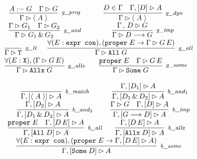 {
\renewcommand{\arraystretch}{3.25}
\newcommand{\GRrlsbc}{\inferH[\rlnmsbc{}]{\seqsl[\Gamma]{\atom{A}}}{\prog{A}{G} & \seqsl[\Gamma]{G}}}
\newcommand{\GRrlsinit}{\inferH[\rlnmsinit{}]{\seqsl[\Gamma]{\atom{A}}}{D \in \Gamma & \bchsl[\Gamma]{D}{A}}}
\newcommand{\GRrlst}{\inferH[\rlnmst{}]{\seqsl[\Gamma]{\sltm{T}}}{}}
\newcommand{\GRrlsand}{\inferH[\rlnmsand{}]{\seqsl[\Gamma]{G_1 \, \& \, G_2}}{\seqsl[\Gamma]{G_1} & \seqsl[\Gamma]{G_2}}}
\newcommand{\GRrlsimp}{\inferH[\rlnmsimp{}]{\seqsl[\Gamma]{D \longrightarrow G}}{\seqsl[\Gamma \, , \, D]{G}}}
\newcommand{\GRrlsall}{\inferH[\rlnmsall{}]{\seqsl[\Gamma]{\sltm{All} \; G}}{\forall (E : \hybridtm{expr con}), (\sltm{proper} \; E \rightarrow \seqsl[\Gamma]{G \, E})}}
\newcommand{\GRrlsalls}{\inferH[\rlnmsalls{}]{\seqsl[\Gamma]{\sltm{Allx} \; G}}{\forall (E : \sltm{X}), (\seqsl[\Gamma]{G \, E})}}
\newcommand{\GRrlssome}{\inferH[\rlnmssome{}]{\seqsl[\Gamma]{\sltm{Some} \; G}}{\sltm{proper} \; E & \seqsl[\Gamma]{G \, E}}}

\begin{figure}%
$$
\begin{tabular}{c c}
\GRrlsbc{}
&
\GRrlsinit{} \\
%
\GRrlsand{}
&
\GRrlsimp{} \\
%
\multicolumn{2}{c}{
\GRrlst{} \;\;\; \GRrlsall{}
} \\
%
\GRrlsalls{}
&
\GRrlssome{} \\
\end{tabular}
$$

\end{figure}
}
%
{
\renewcommand{\arraystretch}{3.25}
\newcommand{\BCrlbmatch}{\inferH[\rlnmbmatch{}]{\bchsl[\Gamma]{\atom{A}}{A}}{}}
\newcommand{\BCrlbanda}{\inferH[\rlnmbanda{}]{\bchsl[\Gamma]{D_1 \, \& \, D_2}{A}}{\bchsl[\Gamma]{D_1}{A}}}
\newcommand{\BCrlbandb}{\inferH[\rlnmbandb{}]{\bchsl[\Gamma]{D_1 \, \& \, D_2}{A}}{\bchsl[\Gamma]{D_2}{A}}}
\newcommand{\BCrlbimp}{\inferH[\rlnmbimp{}]{\bchsl[\Gamma]{G \longrightarrow D}{A}}{\seqsl[\Gamma]{G} & \bchsl[\Gamma]{D}{A}}}
\newcommand{\BCrlball}{\inferH[\rlnmball{}]{\bchsl[\Gamma]{\sltm{All} \; D}{A}}{\sltm{proper} \; E & \bchsl[\Gamma]{D \, E}{A}}}
\newcommand{\BCrlballs}{\inferH[\rlnmballs{}]{\bchsl[\Gamma]{\sltm{Allx} \; D}{A}}{\bchsl[\Gamma]{D \, E}{A}}}
\newcommand{\BCrlbsome}{\inferH[\rlnmbsome{}]{\bchsl[\Gamma]{\sltm{Some} \; D}{A}}{\forall (E : \hybridtm{expr con}), (\sltm{proper} \; E \rightarrow \bchsl[\Gamma]{D \, E}{A})}}

\begin{figure}%

$$
\begin{tabular}{c c}
\BCrlbmatch{}
&
\BCrlbanda{} \\
%
\BCrlbandb{}
&
\BCrlbimp{} \\
%
\BCrlball{}
&
\BCrlballs{} \\
\multicolumn{2}{c}{
\BCrlbsome{}
}
\end{tabular}
$$


\end{figure}
}
